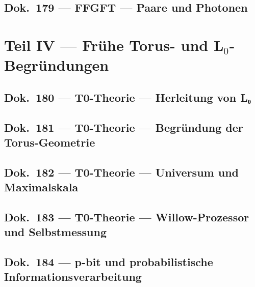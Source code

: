 	\chapter{Dok.~179 --- FFGFT — Paare und Photonen}
	
	\part{Teil IV --- Frühe Torus- und L$_0$-Begründungen}
	\chapter{Dok.~180 --- T0-Theorie — Herleitung von L₀}
	
	\chapter{Dok.~181 --- T0-Theorie — Begründung der Torus-Geometrie}
	
	\chapter{Dok.~182 --- T0-Theorie — Universum und Maximalskala}
	
	\chapter{Dok.~183 --- T0-Theorie — Willow-Prozessor und Selbstmessung}
	
	\chapter{Dok.~184 --- p-bit und probabilistische Informationsverarbeitung}
	{\let\maketitle\relax\let\tableofcontents\relax}

